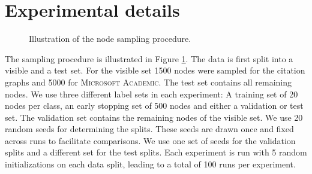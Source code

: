 \documentclass{article} \usepackage{iclr2019_conference,times}
\begin{document}
\section{Experimental details} \label{app:exp}

\begin{figure}[h!]
 \centering
 

  \caption{Illustration of the node sampling procedure.}
 \label{fig:exp:splits}
\end{figure}

The sampling procedure is illustrated in Figure \ref{fig:exp:splits}. The data is first split into a visible and a test set. For the visible set 1500 nodes were sampled for the citation graphs and 5000 for \textsc{Microsoft Academic}. The test set contains all remaining nodes. We use three different label sets in each experiment: A training set of 20 nodes per class, an early stopping set of 500 nodes and either a validation or test set. The validation set contains the remaining nodes of the visible set. We use 20 random seeds for determining the splits. These seeds are drawn once and fixed across runs to facilitate comparisons. We use one set of seeds for the validation splits and a different set for the test splits. Each experiment is run with 5 random initializations on each data split, leading to a total of 100 runs per experiment.
\end{document}
